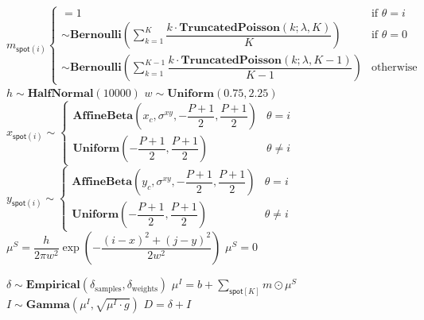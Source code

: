 \begin{algorithm}
\begin{algorithmic}[1]
            \State $ m_{\mathsf{spot}(i)}
                \begin{cases}
                    = 1 & \text{if $\theta = i$} \\
                    \sim \mathbf{Bernoulli} \left( \sum_{k=1}^K \dfrac{k \cdot \mathbf{TruncatedPoisson}(k; \lambda, K)}{K} \right) & \text{if $\theta = 0$} \\
                    \sim \mathbf{Bernoulli} \left( \sum_{k=1}^{K-1} \dfrac{k \cdot \mathbf{TruncatedPoisson}(k; \lambda, K-1)}{K-1} \right) & \text{otherwise}
                \end{cases} $
                \State $h \sim \textbf{HalfNormal}(10000)$
                \State $w \sim \textbf{Uniform}(0.75, 2.25)$
                \State $ x_{\mathsf{spot}(i)} \sim
                    \begin{cases}
                    \mathbf{AffineBeta}\left( x_c, \sigma^{xy}, -\dfrac{P+1}{2}, \dfrac{P+1}{2} \right) & \theta = i \\
                    \mathbf{Uniform}\left(-\dfrac{P+1}{2}, \dfrac{P+1}{2} \right) & \theta \neq i \end{cases} $
                \State $ y_{\mathsf{spot}(i)} \sim
                    \begin{cases}
                    \mathbf{AffineBeta}\left( y_c, \sigma^{xy}, -\dfrac{P+1}{2}, \dfrac{P+1}{2} \right) & \theta = i \\
                    \mathbf{Uniform}\left(-\dfrac{P+1}{2}, \dfrac{P+1}{2} \right) & \theta \neq i \end{cases}
                    $
                \State $\mu^{S} =
                            \dfrac{h}{2 \pi w^2} \exp{\left ( -\dfrac{(i-x)^2 + (j-y)^2}{2w^2} \right)}$
                \EndFor
                \State $\mu^S = 0$
            \EndIf
        \EndFor
            
            \State $\delta \sim \mathbf{Empirical}( \delta_\mathrm{samples}, \delta_\mathrm{weights})$
            \State $\mu^I = b + \sum_{\mathsf{spot}[K]} m \odot \mu^S$
            \State $I \sim \mathbf{Gamma} (\mu^I, \sqrt{\mu^I \cdot g})$
            \State \Return $D = \delta + I$
        \EndFor
    \EndFor
\EndFor{}
\end{algorithmic}
\end{algorithm}

